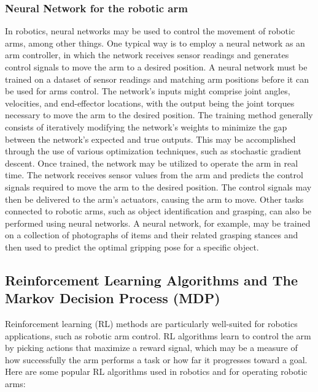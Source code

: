 \documentclass[12pt,oneside]{article}
\begin{document}
\subsubsection{Neural Network for the robotic arm}
In robotics, neural networks may be used to control the movement of robotic arms, among other things. One typical way is to employ a neural network as an arm controller, in which the network receives sensor readings and generates control signals to move the arm to a desired position.
A neural network must be trained on a dataset of sensor readings and matching arm positions before it can be used for arms control. The network's inputs might comprise joint angles, velocities, and end-effector locations, with the output being the joint torques necessary to move the arm to the desired position.
The training method generally consists of iteratively modifying the network's weights to minimize the gap between the network's expected and true outputs. This may be accomplished through the use of various optimization techniques, such as stochastic gradient descent. Once trained, the network may be utilized to operate the arm in real time. The network receives sensor values from the arm and predicts the control signals required to move the arm to the desired position. The control signals may then be delivered to the arm's actuators, causing the arm to move. Other tasks connected to robotic arms, such as object identification and grasping, can also be performed using neural networks. A neural network, for example, may be trained on a collection of photographs of items and their related grasping stances and then used to predict the optimal gripping pose for a specific object.

\subsection{Reinforcement Learning Algorithms and The Markov Decision Process (MDP)}
Reinforcement learning (RL) methods are particularly well-suited for robotics applications, such as robotic arm control. RL algorithms learn to control the arm by picking actions that maximize a reward signal, which may be a measure of how successfully the arm performs a task or how far it progresses toward a goal. Here are some popular RL algorithms used in robotics and for operating robotic arms:
\end{document}
